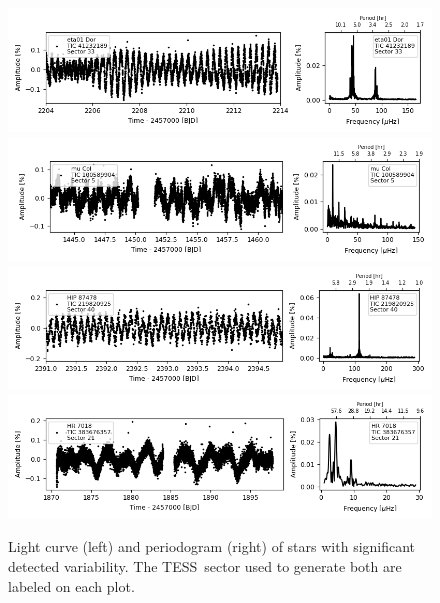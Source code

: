 \documentclass[twocolumn]{aastex631}
\newcommand{\tess}{TESS}
\begin{document}
\begin{figure}
    \centering

    \includegraphics[width=0.9\linewidth]{figures/tic00000041232189_s033_norm1.fits}
    \includegraphics[width=0.9\linewidth]{figures/tic00000100589904_s005_norm1.fits}
    \includegraphics[width=0.9\linewidth]{figures/tic00000219820925_s040_norm1.fits.png}
    \includegraphics[width=0.9\linewidth]{figures/tic00000383676357_s021_norm1.fits.png}

    \caption{Light curve (left) and periodogram (right) of stars with significant detected variability. The \tess\ sector used to generate both are labeled on each plot.}
    \label{fig:lcft3}
\end{figure}
    
\end{document}
